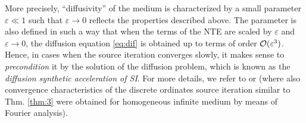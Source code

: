 More precisely, 
``diffusivity'' of the medium is characterized by a small parameter $\varepsilon \ll 1$ such that $\varepsilon\to 0$ 
reflects the properties described above. The parameter is also defined in such a way that when the terms of the NTE are 
scaled by $\varepsilon$ and $\varepsilon \to 0$, the diffusion equation \eqref{eq:dif} is obtained up to terms of
order $\mathcal{O}(\varepsilon^3)$. Hence, in cases when the source iteration converges slowly, it makes sense to 
\textit{precondition} it by the solution of the diffusion problem, which is known as the \textit{diffusion synthetic
acceleration of SI}. For more details, we refer to \cite[Chap. 1]{Azmy1} or \cite[Sec. III]{Adams} (where also
convergence characteristics of the discrete ordinates source iteration similar to Thm. \ref{thm:3} were obtained for
homogeneous infinite medium by means of Fourier analysis).
\clearpage
